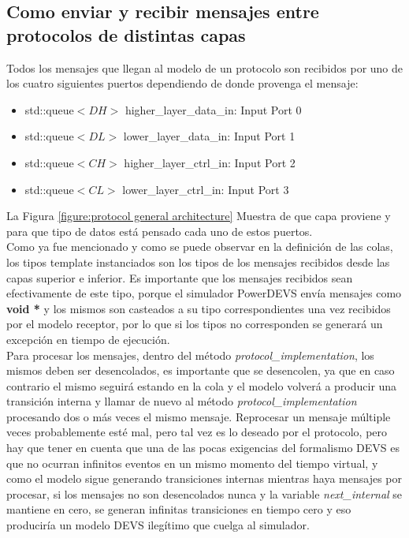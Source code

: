 \documentclass[10pt,a4paper]{article}
\begin{document}
\subsection{Como enviar y recibir mensajes entre protocolos de distintas capas}

Todos los mensajes que llegan al modelo de un protocolo son recibidos por uno de los cuatro siguientes puertos dependiendo de donde provenga el mensaje:
\begin{itemize}
\item std::queue$<DH>$ higher\_layer\_data\_in:  Input Port 0
\item std::queue$<DL>$ lower\_layer\_data\_in:   Input Port 1
\item std::queue$<CH>$ higher\_layer\_ctrl\_in:  Input Port 2 
\item std::queue$<CL>$ lower\_layer\_ctrl\_in:   Input Port 3
\end{itemize}

La Figura \ref{figure:protocol general architecture} Muestra de que capa proviene y para que tipo de datos está pensado cada uno de estos puertos. \\

Como ya fue mencionado y como se puede observar en la definición de las colas, los tipos template instanciados son los tipos de los mensajes recibidos desde las capas superior e inferior. Es importante que los mensajes recibidos sean efectivamente de este tipo, porque el simulador PowerDEVS envía mensajes como \textbf{void *} y los mismos son casteados a su tipo correspondientes una vez recibidos por el modelo receptor, por lo que si los tipos no corresponden se generará un excepción en tiempo de ejecución. \\

Para procesar los mensajes, dentro del método \textit{protocol\_implementation}, los mismos deben ser desencolados, es importante que se desencolen, ya que en caso contrario el mismo seguirá estando en la cola y el modelo volverá a producir una transición interna y llamar de nuevo al método \textit{protocol\_implementation} procesando dos o más veces el mismo mensaje. Reprocesar un mensaje múltiple veces probablemente esté mal, pero tal vez es lo deseado por el protocolo, pero hay que tener en cuenta que una de las pocas exigencias del formalismo DEVS es que no ocurran infinitos eventos en un mismo momento del tiempo virtual, y como el modelo sigue generando transiciones internas mientras haya mensajes por procesar, si los mensajes no son desencolados nunca y la variable \textit{next\_internal} se mantiene en cero, se generan infinitas transiciones en tiempo cero y eso produciría un modelo DEVS ilegítimo que cuelga al simulador. \\
\end{document}
